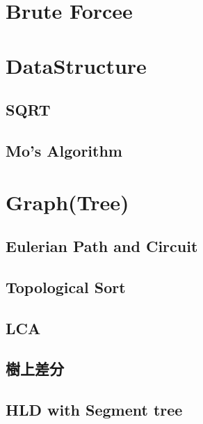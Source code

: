 \section{Brute Forcee}


\section{DataStructure}

\subsection{SQRT}


\subsection{Mo's Algorithm}


\section{Graph(Tree)}

\subsection{Eulerian Path and Circuit}


\subsection{Topological Sort}


\subsection{LCA}


\subsection{樹上差分}


\subsection{HLD with Segment tree}


